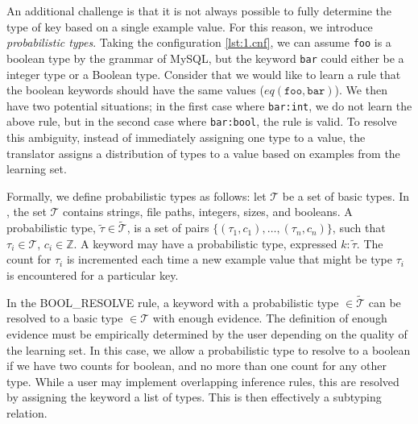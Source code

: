An additional challenge is that it is not always possible to fully determine the type of key based on a single example value. 
For this reason, we introduce {\emph {probabilistic types}}.
Taking the configuration \ref{lst:1.cnf}, we can assume {\tt foo} is a boolean type by the grammar of MySQL,
  but the keyword {\tt bar} could either be a integer type or a Boolean type.
Consider that we would like to learn a rule that the boolean keywords should have the same values ($eq(\texttt{foo},\texttt{bar})$).
We then have two potential situations; in the first case where {\tt bar:int}, we do not learn the above rule, but in the second case where {\tt bar:bool}, the rule is valid.
To resolve this ambiguity, instead of immediately assigning one type to a value, the translator assigns a distribution of types to a value based on examples from the learning set.

Formally, we define probabilistic types as follows: let $\mathcal{T}$ be a set of basic types.
In \app, the set $\mathcal{T}$ contains strings, file paths, integers, sizes, and booleans. 
A probabilistic type, $\tilde{\tau} \in \tilde{\mathcal{T}}$, is a set of pairs $\{(\tau_1, c_1),\ldots,(\tau_n, c_n)\}$, such that $\tau_i \in \mathcal{T}$, $c_i \in \mathbb{Z}$. 
A keyword may have a probabilistic type, expressed $k:\tilde{\tau}$.
The count for $\tau_i$ is incremented each time a new example value that might be type $\tau_i$ is encountered for a particular key.


In the {\scriptsize BOOL\_RESOLVE} rule, a keyword with a probabilistic type $\in \tilde{\mathcal{T}}$ can be resolved to a basic type $\in \mathcal{T}$ with enough evidence.
The definition of enough evidence must be empirically determined by the user depending on the quality of the learning set.
In this case, we allow a probabilistic type to resolve to a boolean if we have two counts for boolean, and no more than one count for any other type.
While a user may implement overlapping inference rules, this are resolved by assigning the keyword a list of types.
This is then effectively a subtyping relation.

